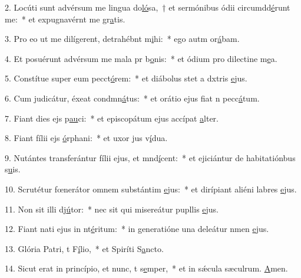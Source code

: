 2. Locúti sunt advérsum me lingua do\uline{ló}sa,~† et sermónibus ódii circumdd\uline{é}runt me:~* et expugnavérnt me gr\uline{a}tis.\par 
3. Pro eo ut me dilígerent, detrahébnt m\uline{i}hi:~* ego autm or\uline{á}bam.\par 
4. Et posuérunt advérsum me mala pr b\uline{o}nis:~* et ódium pro dilectine m\uline{e}a.\par 
5. Constítue super eum pecct\uline{ó}rem:~* et diábolus stet a dxtris \uline{e}jus.\par 
6. Cum judicátur, éxeat condmn\uline{á}tus:~* et orátio ejus fiat n pecc\uline{á}tum.\par 
7. Fiant dies ejs p\uline{au}ci:~* et episcopátum ejus accípat \uline{a}lter.\par 
8. Fiant fílii ejs \uline{ó}rphani:~* et uxor jus v\uline{í}dua.\par 
9. Nutántes transferántur fílii ejus, et mnd\uline{í}cent:~* et ejiciántur de habitatiónbus s\uline{u}is.\par 
10. Scrutétur fœnerátor omnem substántim \uline{e}jus:~* et dirípiant aliéni labres \uline{e}jus.\par 
11. Non sit illi dj\uline{ú}tor:~* nec sit qui misereátur pupllis \uline{e}jus.\par 
12. Fiant nati ejus in nt\uline{é}ritum:~* in generatióne una deleátur nmen \uline{e}jus.\par 
13. Glória Patri, t F\uline{í}lio,~* et Spiríti S\uline{a}ncto.\par 
14. Sicut erat in princípio, et nunc, t s\uline{e}mper,~* et in sǽcula sæculrum. \uline{A}men.\par 
